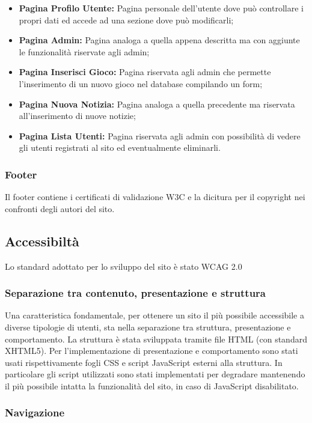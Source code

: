 \begin{itemize}
	\item \textbf{Pagina Profilo Utente:} Pagina personale dell'utente dove può controllare i propri dati ed accede ad una sezione dove può modificarli;
	\item \textbf{Pagina Admin:} Pagina analoga a quella appena descritta ma con aggiunte le funzionalità riservate agli admin;
	\item \textbf{Pagina Inserisci Gioco:} Pagina riservata agli admin che permette l'inserimento di un nuovo gioco nel database compilando un form;
	\item \textbf{Pagina Nuova Notizia:} Pagina analoga a quella precedente ma riservata all'inserimento di nuove notizie;
	\item \textbf{Pagina Lista Utenti:} Pagina riservata agli admin con possibilità di vedere gli utenti registrati al sito ed eventualmente eliminarli.
\end{itemize}

\subsubsection{Footer}
Il footer contiene i certificati di validazione W3C e la dicitura per il copyright nei confronti degli autori del sito.



\subsection{Accessibiltà}
Lo standard adottato per lo sviluppo del sito è stato WCAG 2.0

\subsubsection{Separazione tra contenuto, presentazione e struttura}
Una caratteristica fondamentale, per ottenere un sito il più possibile accessibile a diverse tipologie di utenti, sta nella separazione tra struttura, presentazione e comportamento. La struttura è stata sviluppata tramite file HTML (con standard XHTML5). Per l'implementazione di presentazione e comportamento sono stati usati rispettivamente fogli CSS e script JavaScript esterni alla struttura. In particolare gli script utilizzati sono stati implementati per degradare mantenendo il più possibile intatta la funzionalità del sito, in caso di JavaScript disabilitato.   

\subsubsection{Navigazione}

